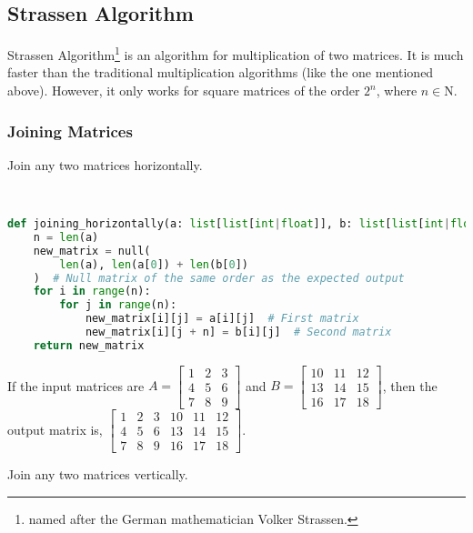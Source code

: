 \subsection{Strassen Algorithm}
Strassen Algorithm\footnote{named after the German mathematician Volker Strassen.} is an algorithm for multiplication of two matrices. It is much faster than the traditional multiplication algorithms (like the one mentioned above). However, it only works for square matrices of the order $2^n$, where $n\in \mathrm{N}$.
\subsubsection{Joining Matrices}
\begin{eg}
	Join any two matrices horizontally.
\end{eg}
\begin{explanation}
	\phantom \\
	\begin{lstlisting}[language=Python, numbers=none]
def joining_horizontally(a: list[list[int|float]], b: list[list[int|float]]) -> list[list[int|float]]:
	n = len(a)
	new_matrix = null(
		len(a), len(a[0]) + len(b[0])
	)  # Null matrix of the same order as the expected output
	for i in range(n):
		for j in range(n):  
			new_matrix[i][j] = a[i][j]  # First matrix
			new_matrix[i][j + n] = b[i][j]  # Second matrix
	return new_matrix \end{lstlisting}
	If the input matrices are $A=\begin{bmatrix}
			1 & 2 & 3 \\
			4 & 5 & 6 \\
			7 & 8 & 9
		\end{bmatrix}$ and $B=\begin{bmatrix}
			10 & 11 & 12 \\
			13 & 14 & 15 \\
			16 & 17 & 18
		\end{bmatrix}$, then the output matrix is, $\begin{bmatrix}
			1 & 2 & 3 & 10 & 11 & 12 \\
			4 & 5 & 6 & 13 & 14 & 15 \\
			7 & 8 & 9 & 16 & 17 & 18
		\end{bmatrix}$.
\end{explanation}
\begin{eg}
	Join any two matrices vertically.
\end{eg}
